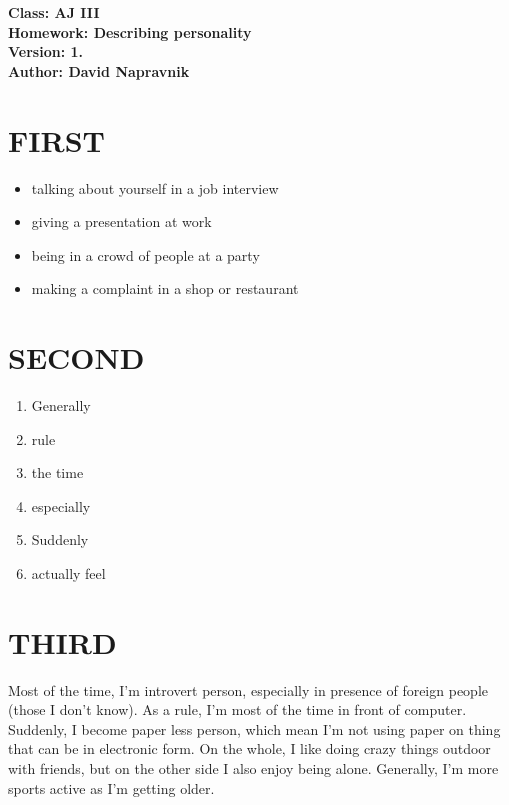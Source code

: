 \documentclass[a4paper]{article}
\begin{document}
\noindent
\textbf{Class: AJ III}\\
\textbf{Homework: Describing personality}\\
\textbf{Version: 1.}\\
\textbf{Author: David Napravnik}

\section*{FIRST}
\begin{itemize}
	\item talking about yourself in a job interview
	\item giving a presentation at work
	\item being in a crowd of people at a party
	\item making a complaint in a shop or restaurant
\end{itemize}


\section*{SECOND}
\begin{enumerate}
	\item Generally
	\item rule
	\item the time
	\item especially
	\item Suddenly
	\item actually feel
\end{enumerate}


\section*{THIRD}
Most of the time, I'm introvert person, especially in presence of foreign people (those I don't know).
As a rule, I'm most of the time in front of computer. 
Suddenly, I become paper less person, which mean I'm not using paper on thing that can be in electronic form.
On the whole, I like doing crazy things outdoor with friends, but on the other side I also enjoy being alone.
Generally, I'm more sports active as I'm getting older.
\end{document}
